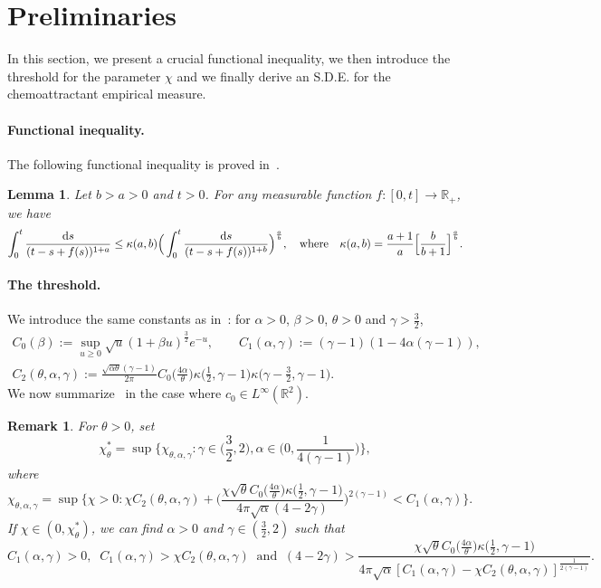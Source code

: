 \documentclass[11pt]{article}
\newtheorem{lemma}[theorem]{Lemma}
\newtheorem{remark}[theorem]{Remark}
\newcommand{\R}{\mathbb{R}}
\newcommand{\1}{\mathbbm{1}}
\newcommand{\dd}{{\rm d}}
\begin{document}
\section{Preliminaries}
\label{spre}

In this section, we present a crucial functional inequality, we then introduce the threshold for the parameter
$\chi$ and we finally derive an S.D.E. for the chemoattractant empirical measure.

\paragraph{Functional inequality.} 
The following functional inequality is proved in~\cite{FT1}.

\begin{lemma}
\label{lemma:FI}
Let $b>a>0$ and $t>0$. For any measurable function $f:[0, t] \to \R_+  $, we have 
$$
\int_0^t \frac{\dd s}{(t-s+ f(s))^{1+a}}\leq \kappa(a,b) 
\Big(\int_0^t \frac{\dd s}{(t-s+ f(s))^{1+b}}\Big)^{\frac{a}{b}},\quad \hbox{where} \quad
\kappa(a,b)=\frac{a+1}{a}\Big[\frac{b}{b+1}\Big]^{\frac a b}.
$$
\end{lemma}

\paragraph{The threshold.}

We introduce the same constants as in~\cite{FT1}: for $\alpha>0$, $\beta>0$, $\theta>0$ and 
$\gamma>\frac 32$,
\begin{gather}\label{eq:C0}
C_0(\beta):=\sup_{u\ge 0} \sqrt u (1+\beta u) ^{\frac 32} e^{-u}, \qquad
C_1(\alpha,\gamma):=(\gamma-1)(1-4\alpha(\gamma-1)),\\
\label{eq:C2}
C_2(\theta,\alpha,\gamma):= \frac{\sqrt{\alpha\theta}(\gamma-1)}{2\pi}C_0\Big(\frac{4\alpha}{\theta}\Big) 
\kappa\Big(\frac{1}{2}, \gamma-1\Big)\kappa\Big(\gamma-\frac32,\gamma-1\Big).
\end{gather}
We now summarize~\cite[Section~6]{FT1} in the case where $c_0 \in L^\infty(\R^2)$.


\begin{remark}\label{chistar}
For $\theta>0$, set 
$$
\chi^*_\theta=\sup\Big\{ \chi_{\theta,\alpha,\gamma} : \gamma \in \Big(\frac32,2\Big), 
\alpha \in \Big(0,\frac1{4(\gamma-1)}\Big) \Big\},
$$
where
$$
\chi_{\theta,\alpha,\gamma}= \sup\Big\{\chi>0 :\chi C_2(\theta,\alpha,\gamma) + 
\Big(\frac{\chi\sqrt\theta C_0\big(\frac{4\alpha}\theta\big) \kappa\big(\frac{1}{2}, \gamma-1\big)}
{4\pi\sqrt\alpha(4-2\gamma)}\Big)^{2(\gamma-1)} < C_1(\alpha,\gamma) \Big\}.
$$
If $\chi \in (0,\chi^*_\theta)$, we can find $\alpha>0$ and  $\gamma \in (\frac32,2)$ such that
\begin{equation}\label{condistar}
C_1(\alpha,\gamma)\!>\!0,\;\; C_1(\alpha,\gamma)\!>\!\chi C_2(\theta,\alpha,\gamma) \;\;\text{and}\;\;
(4-2\gamma)> \frac{\chi\sqrt{\theta} C_0\big(\frac{4\alpha}{\theta}\big) 
\kappa\big(\frac{1}{2}, \gamma-1\big)}{4\pi\sqrt{\alpha}[C_1(\alpha,\gamma) 
-\chi C_2(\theta,\alpha,\gamma)]^{\frac 1{2(\gamma-1)}}}.
\end{equation}
\end{remark}
\end{document}
